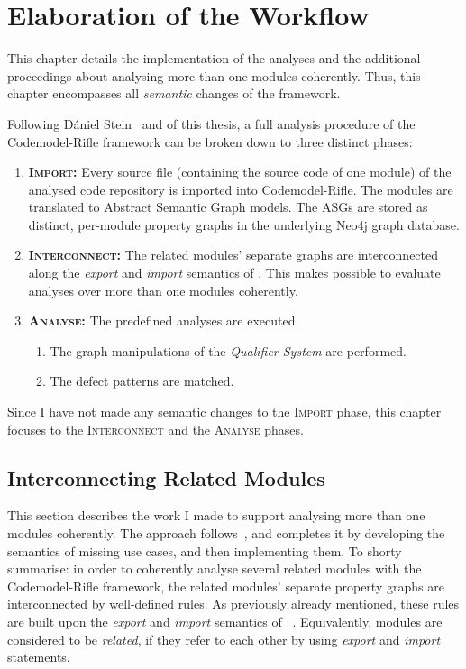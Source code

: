 \chapter{Elaboration of the Workflow}
\label{chapter:elaboration}

This chapter details the implementation of the analyses and the additional proceedings about analysing more than one \es modules coherently. Thus, this chapter encompasses all \emph{semantic} changes of the framework.

Following Dániel Stein~\cite{stein-daniel-msc} and  of this thesis, a full analysis procedure of the Codemodel-Rifle framework can be broken down to three distinct phases:

\begin{enumerate}
\item \textsc{\textbf{Import:}} Every \es source file (containing the source code of one \es module) of the analysed code repository is imported into Codemodel-Rifle. The modules are translated to Abstract Semantic Graph models. The ASGs are stored as distinct, per-module property graphs in the underlying Neo4j graph database.
\item \textsc{\textbf{Interconnect:}} The related modules' separate graphs are interconnected along the \emph{export} and \emph{import} semantics of \es. This makes possible to evaluate analyses over more than one modules coherently.
\item \textsc{\textbf{Analyse:}} The predefined analyses are executed.
	\begin{enumerate}
	\item The graph manipulations of the \emph{Qualifier System} are performed.
	\item The defect patterns are matched.
	\end{enumerate}
\end{enumerate}

Since I have not made any semantic changes to the \textsc{Import} phase, this chapter focuses to the \textsc{Interconnect} and the \textsc{Analyse} phases.


\section{Interconnecting Related \es Modules}
\label{section:interconnect}

This section describes the work I made to support analysing more than one \es modules coherently. The approach follows~\cite{stein-daniel-msc}, and completes it by developing the semantics of missing use cases, and then implementing them. To shorty summarise: in order to coherently analyse several related \es modules with the Codemodel-Rifle framework, the related modules' separate property graphs are interconnected by well-defined rules. As previously already mentioned, these rules are built upon the \emph{export} and \emph{import} semantics of \es~\cite{exploringes6}. Equivalently, \es modules are considered to be \emph{related}, if they refer to each other by using \emph{export} and \emph{import} statements.


